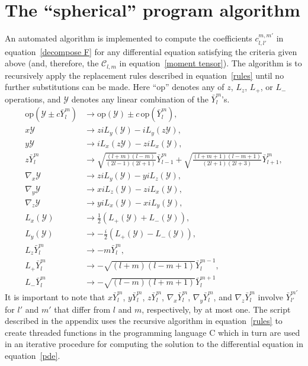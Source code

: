 \documentclass{amsart}
\begin{document}
\section{The ``spherical'' program algorithm}

An automated algorithm is implemented to compute the coefficients $c_{l,l'}^{m,m'}$ in equation~\eqref{decompose F} for
any differential equation satisfying the criteria given above (and, therefore, the $\mathcal C_{l,m}$ in equation~\eqref{moment tensor}). The
algorithm is to recursively apply the replacement rules described in equation~\eqref{rules} until no further substitutions can be made. Here ``op''
denotes any of $z$, $L_z$, $L_+$, or $L_-$ operations, and $\mathcal Y$ denotes any linear combination of the $\bar Y_l^m$'s.
\begin{equation}
\label{rules}
\begin{split}
\text{op}(\mathcal Y \pm c \bar Y_l^m) &\to \text{op}(\mathcal Y) \pm c \, \text{op}(\bar Y_l^m), \\
x \mathcal Y &\to  z i L_y(\mathcal Y) - i L_y(z\mathcal Y), \\
y \mathcal Y &\to  i L_x(z\mathcal Y) - z i L_x(\mathcal Y), \\
z\bar Y_l^m &\to \sqrt{\frac{(l+m)(l-m)}{(2l-1)(2l+1)}} \bar Y_{l-1}^m + \sqrt{\frac{(l+m+1)(l-m+1)}{(2l+1)(2l+3)}} \bar Y_{l+1}^m ,\\
\nabla_x \mathcal Y &\to z i L_y(\mathcal Y) - y i L_z(\mathcal Y),  \\
\nabla_y \mathcal Y &\to x i L_z(\mathcal Y) - z i L_x(\mathcal Y),  \\
\nabla_z \mathcal Y &\to y i L_x(\mathcal Y) - x i L_y(\mathcal Y),  \\
L_x (\mathcal Y) &\to \tfrac 12 \left(L_+ (\mathcal Y) + L_- (\mathcal Y)\right), \\
L_y (\mathcal Y) &\to -\tfrac i2 \left(L_+ (\mathcal Y) - L_- (\mathcal Y)\right), \\
L_z \bar Y_l^m &\to -m\bar Y_l^m ,\\
L_+ \bar Y_l^m &\to - \sqrt{(l+m)(l-m+1)}\bar Y_l^{m-1}, \\
L_- \bar Y_l^m &\to - \sqrt{(l-m)(l+m+1)}\bar Y_l^{m+1}
\end{split}
\end{equation}
It is important to note that $x \bar Y_l^m$, $y \bar Y_l^m$, $z \bar Y_l^m$, $\nabla_x\bar Y_l^m$, $\nabla_y \bar Y_l^m$, and $\nabla_z \bar Y_l^m$
involve $\bar Y_{l'}^{m'}$ for $l'$ and $m'$ that differ from $l$ and $m$, respectively, by at most one.  The script described in the appendix uses
the recursive algorithm in equation~\eqref{rules} to create threaded functions in the programming language
C which in turn are used in an iterative procedure for computing the solution to the differential equation in equation~\eqref{pde}.
\end{document}
